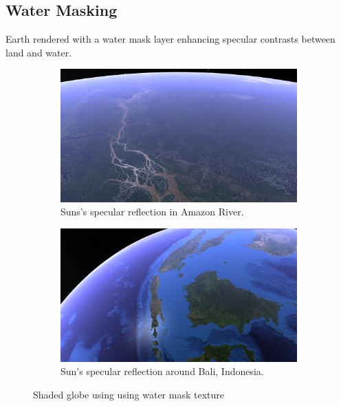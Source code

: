 \subsection{Water Masking}
\FloatBarrier
Earth rendered with a water mask layer enhancing specular contrasts between land and water.
\begin{figure}[h]
    \centering
    \begin{subfigure}[bt]{0.9\textwidth}
        \includegraphics[width=\textwidth]{figures/results/screenshots/specular_brazil.png}
        \caption{Suns's specular reflection in Amazon River.}
    \end{subfigure}
    \begin{subfigure}[bt]{0.9\textwidth}
        \includegraphics[width=\textwidth]{figures/results/screenshots/specular_indonesia.png}
        \caption{Sun's specular reflection around Bali, Indonesia.}
    \end{subfigure}
    \caption{Shaded globe using using water mask texture}
\end{figure}

\clearpage
